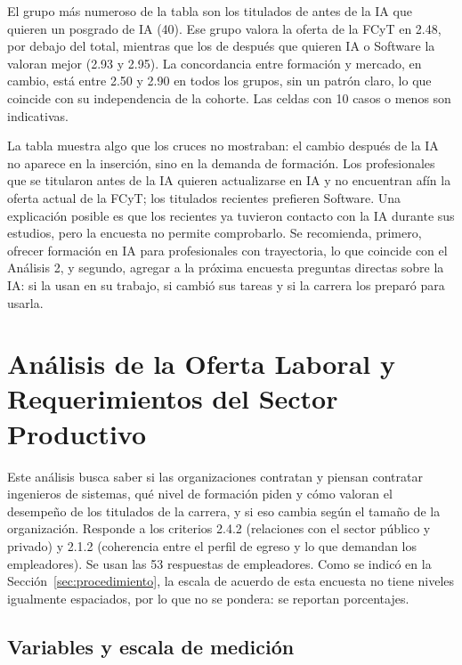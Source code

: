 \documentclass[12pt, a4paper]{article}
\begin{document}
El grupo más numeroso de la tabla son los titulados de antes de la IA
que quieren un posgrado de IA (40). Ese grupo valora la oferta de la
FCyT en 2.48, por debajo del total, mientras que los de después que
quieren IA o Software la valoran mejor (2.93 y 2.95). La concordancia
entre formación y mercado, en cambio, está entre 2.50 y 2.90 en todos los
grupos, sin un patrón claro, lo que coincide con su independencia de la
cohorte. Las celdas con 10 casos o menos son indicativas.

La tabla muestra algo que los cruces no mostraban: el cambio después de
la IA no aparece en la inserción, sino en la demanda de formación. Los
profesionales que se titularon antes de la IA quieren actualizarse en IA
y no encuentran afín la oferta actual de la FCyT; los titulados recientes
prefieren Software. Una explicación posible es que los recientes ya
tuvieron contacto con la IA durante sus estudios, pero la encuesta no
permite comprobarlo. Se recomienda, primero, ofrecer formación en IA para
profesionales con trayectoria, lo que coincide con el Análisis 2, y
segundo, agregar a la próxima encuesta preguntas directas sobre la IA:
si la usan en su trabajo, si cambió sus tareas y si la carrera los
preparó para usarla.

\section{Análisis de la Oferta Laboral y Requerimientos del Sector Productivo}\label{sec:empleadores}

Este análisis busca saber si las organizaciones contratan y piensan
contratar ingenieros de sistemas, qué nivel de formación piden y cómo
valoran el desempeño de los titulados de la carrera, y si eso cambia
según el tamaño de la organización. Responde a los criterios 2.4.2
(relaciones con el sector público y privado) y 2.1.2 (coherencia entre
el perfil de egreso y lo que demandan los empleadores). Se usan las 53
respuestas de empleadores. Como se indicó en la
Sección~\ref{sec:procedimiento}, la escala de acuerdo de esta encuesta no
tiene niveles igualmente espaciados, por lo que no se pondera: se
reportan porcentajes.

\subsection{Variables y escala de medición}
\end{document}
